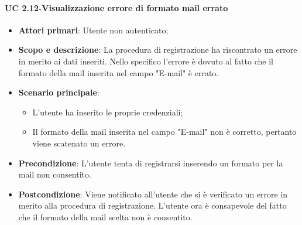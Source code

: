             \paragraph{UC 2.12-Visualizzazione errore di formato mail errato}
            \begin{itemize}
                \item \textbf{Attori primari}: Utente non autenticato;
                
                \item \textbf{Scopo e descrizione}: La procedura di registrazione ha riscontrato un errore in merito ai
                dati inseriti. Nello specifico l'errore è dovuto al fatto che il formato della mail inserita nel campo "E-mail" è errato.
                   
                \item \textbf{Scenario principale}: 
                    \begin{itemize}
                        \item L'utente ha inserito le proprie credenziali;
                        \item Il formato della mail inserita nel campo "E-mail" non è corretto, pertanto viene scatenato un errore.
                    \end{itemize}
                \item \textbf{Precondizione}:  L'utente tenta di registrarsi inserendo un formato per la mail non consentito.
                 \item \textbf{Postcondizione}: Viene notificato all'utente che si è verificato un errore in merito
                alla procedura di registrazione. L'utente ora è consapevole del fatto che il formato della mail scelta non è consentito.
            \end{itemize}
        
        
        
         
